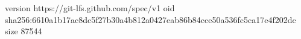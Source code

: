version https://git-lfs.github.com/spec/v1
oid sha256:6610a1b17ac8dc5f27b30a4b812a0427eab86b84cce50a536fc5ca17e4f202dc
size 87544
